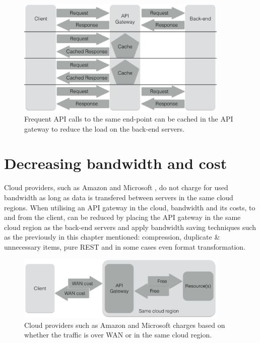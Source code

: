 \documentclass{cslthse-msc}
\begin{document}
\begin{figure}[H]
  \centering
    \begin{center}
      \includegraphics[width=0.9\textwidth]{images/api_gateway_cache.png}
    \end{center}
  \caption{Frequent API calls to the same end-point can be cached in the API gateway to reduce the load on the back-end servers.}
\end{figure}

\section{Decreasing bandwidth and cost}
Cloud providers, such as Amazon \cite{cloud_amazon} and Microsoft \cite{cloud_microsoft}, do not charge for used bandwidth as long as data is transfered between servers in the same cloud regions. When utilising an API gateway in the cloud, bandwidth and its costs, to and from the client, can be reduced by placing the API gateway in the same cloud region as the back-end servers and apply bandwidth saving techniques such as the previously in this chapter mentioned: compression, duplicate \& unnecessary items, pure REST and in some cases even format transformation.

\begin{figure}[H]
  \centering
    \begin{center}
      \includegraphics[width=0.9\textwidth]{images/api_gateway_bandwidth.png}
    \end{center}
  \caption{Cloud providers such as Amazon \cite{cloud_amazon} and Microsoft \cite{cloud_microsoft} charges based on whether the traffic is over WAN or in the same cloud region.}
\end{figure}
\end{document}
